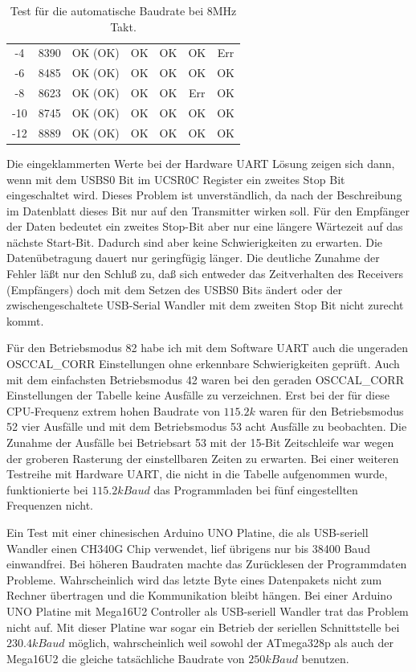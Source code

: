 \begin{table}[H]
\begin{center}
\begin{tabular}{| c | c || c | c | c || c | c |}
    \hline
    -4     &  8390   &  OK (OK)   &   OK     &   OK    &  OK     &   Err \\
    -6     &  8485   &  OK (OK)   &   OK     &   OK    &  OK     &   OK  \\
    \hline
    -8     &  8623   &  OK (OK)   &   OK     &   OK    &  Err    &   OK  \\
    -10    &  8745   &  OK (OK)   &   OK     &   OK    &  OK     &   OK  \\
    -12    &  8889   &  OK (OK)   &   OK     &   OK    &  OK     &   OK  \\
    \hline
    \end{tabular}
  \end{center}
  \caption{Test für die automatische Baudrate bei 8MHz Takt.}
  \label{tab:AutoBaudTest8}
\end{table}

Die eingeklammerten Werte bei der Hardware UART Lösung zeigen sich dann,
wenn mit dem USBS0 Bit im UCSR0C Register ein zweites Stop Bit eingeschaltet wird.
Dieses Problem ist unverständlich, da nach der Beschreibung im Datenblatt dieses Bit
nur auf den Transmitter wirken soll.
Für den Empfänger der Daten bedeutet ein zweites Stop-Bit aber nur eine längere Wärtezeit
auf das nächste Start-Bit. Dadurch sind aber keine Schwierigkeiten zu erwarten.
Die Datenübetragung dauert nur geringfügig länger. Die deutliche Zunahme der Fehler
läßt nur den Schluß zu, daß sich entweder das Zeitverhalten des Receivers (Empfängers)
doch mit dem Setzen des USBS0 Bits ändert oder der zwischengeschaltete USB-Serial Wandler
mit dem zweiten Stop Bit nicht zurecht kommt.


Für den Betriebsmodus 82 habe ich mit dem Software UART
auch die ungeraden OSCCAL\_CORR Einstellungen ohne erkennbare Schwierigkeiten geprüft.
Auch mit dem einfachsten Betriebsmodus 42 waren bei den geraden OSCCAL\_CORR
Einstellungen der Tabelle keine Ausfälle zu verzeichnen.
Erst bei der für diese CPU-Frequenz extrem hohen Baudrate von \(115.2k\) waren 
für den Betriebsmodus 52 vier Ausfälle und mit dem Betriebsmodus 53 acht Ausfälle
zu beobachten. Die Zunahme der Ausfälle bei Betriebsart 53 mit der 15-Bit Zeitschleife war
wegen der groberen Rasterung der einstellbaren Zeiten zu erwarten.
Bei einer weiteren Testreihe mit Hardware UART, die nicht in die Tabelle aufgenommen wurde,
funktionierte bei \(115.2kBaud\) das Programmladen bei fünf eingestellten Frequenzen nicht.

Ein Test mit einer chinesischen Arduino UNO Platine, die als USB-seriell Wandler einen
CH340G Chip verwendet, lief übrigens nur bis 38400 Baud einwandfrei.
Bei höheren Baudraten machte das Zurücklesen der Programmdaten Probleme.
Wahrscheinlich wird das letzte Byte eines Datenpakets nicht zum Rechner übertragen und
die Kommunikation bleibt hängen. Bei einer Arduino UNO Platine mit Mega16U2 Controller
als USB-seriell Wandler trat das Problem nicht auf. Mit dieser Platine war sogar
ein Betrieb der seriellen Schnittstelle bei \(230.4kBaud\) möglich, wahrscheinlich
weil sowohl der ATmega328p als auch der Mega16U2 die gleiche tatsächliche Baudrate
von \(250kBaud\) benutzen.


